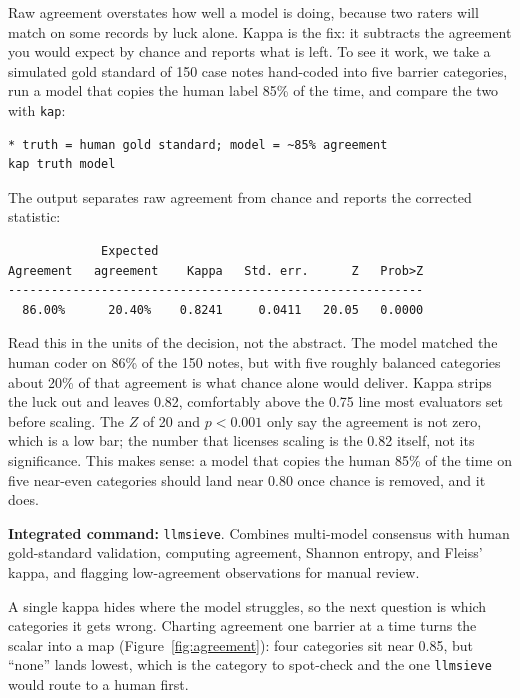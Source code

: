 \documentclass[
    a4paper,
    fontsize=10pt,
    twoside=true,
    numbers=noenddot,
]{kaobook}
\begin{document}
Raw agreement overstates how well a model is doing, because two raters will match on some records by luck alone. Kappa is the fix: it subtracts the agreement you would expect by chance and reports what is left. To see it work, we take a simulated gold standard of 150 case notes hand-coded into five barrier categories, run a model that copies the human label 85\% of the time, and compare the two with \texttt{kap}:
{\footnotesize
\begin{verbatim}
* truth = human gold standard; model = ~85% agreement
kap truth model
\end{verbatim}
}
The output separates raw agreement from chance and reports the corrected statistic:
{\footnotesize
\begin{verbatim}
             Expected
Agreement   agreement    Kappa   Std. err.      Z   Prob>Z
----------------------------------------------------------
  86.00%      20.40%    0.8241     0.0411   20.05   0.0000
\end{verbatim}
}
Read this in the units of the decision, not the abstract. The model matched the human coder on 86\% of the 150 notes, but with five roughly balanced categories about 20\% of that agreement is what chance alone would deliver. Kappa strips the luck out and leaves 0.82, comfortably above the 0.75 line most evaluators set before scaling. The $Z$ of 20 and $p<0.001$ only say the agreement is not zero, which is a low bar; the number that licenses scaling is the 0.82 itself, not its significance. This makes sense: a model that copies the human 85\% of the time on five near-even categories should land near 0.80 once chance is removed, and it does.

\begin{kaobox}[frametitle=Package Integration: \texttt{llmsieve}]
\textbf{Integrated command:} \texttt{llmsieve}. Combines multi-model consensus with human gold-standard validation, computing agreement, Shannon entropy, and Fleiss' kappa, and flagging low-agreement observations for manual review.
\end{kaobox}

A single kappa hides where the model struggles, so the next question is which categories it gets wrong. Charting agreement one barrier at a time turns the scalar into a map (Figure~\ref{fig:agreement}): four categories sit near 0.85, but \enquote{none} lands lowest, which is the category to spot-check and the one \texttt{llmsieve} would route to a human first.
\end{document}
